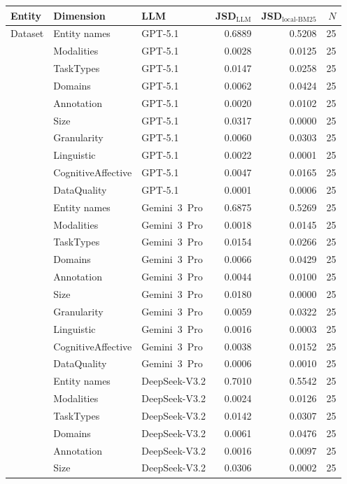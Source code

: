 \begin{tabular}{lllrrr}
\toprule
Entity & Dimension & LLM & JSD$_{\mathrm{LLM}}$ & JSD$_{\mathrm{local\text{-}BM25}}$ & $N$ \\
\midrule
Dataset & Entity names & GPT-5.1 & 0.6889 & 0.5208 & 25 \\
 & Modalities & GPT-5.1 & 0.0028 & 0.0125 & 25 \\
 & TaskTypes & GPT-5.1 & 0.0147 & 0.0258 & 25 \\
 & Domains & GPT-5.1 & 0.0062 & 0.0424 & 25 \\
 & Annotation & GPT-5.1 & 0.0020 & 0.0102 & 25 \\
 & Size & GPT-5.1 & 0.0317 & 0.0000 & 25 \\
 & Granularity & GPT-5.1 & 0.0060 & 0.0303 & 25 \\
 & Linguistic & GPT-5.1 & 0.0022 & 0.0001 & 25 \\
 & CognitiveAffective & GPT-5.1 & 0.0047 & 0.0165 & 25 \\
 & DataQuality & GPT-5.1 & 0.0001 & 0.0006 & 25 \\
 & Entity names & Gemini~3~Pro & 0.6875 & 0.5269 & 25 \\
 & Modalities & Gemini~3~Pro & 0.0018 & 0.0145 & 25 \\
 & TaskTypes & Gemini~3~Pro & 0.0154 & 0.0266 & 25 \\
 & Domains & Gemini~3~Pro & 0.0066 & 0.0429 & 25 \\
 & Annotation & Gemini~3~Pro & 0.0044 & 0.0100 & 25 \\
 & Size & Gemini~3~Pro & 0.0180 & 0.0000 & 25 \\
 & Granularity & Gemini~3~Pro & 0.0059 & 0.0322 & 25 \\
 & Linguistic & Gemini~3~Pro & 0.0016 & 0.0003 & 25 \\
 & CognitiveAffective & Gemini~3~Pro & 0.0038 & 0.0152 & 25 \\
 & DataQuality & Gemini~3~Pro & 0.0006 & 0.0010 & 25 \\
 & Entity names & DeepSeek-V3.2 & 0.7010 & 0.5542 & 25 \\
 & Modalities & DeepSeek-V3.2 & 0.0024 & 0.0126 & 25 \\
 & TaskTypes & DeepSeek-V3.2 & 0.0142 & 0.0307 & 25 \\
 & Domains & DeepSeek-V3.2 & 0.0061 & 0.0476 & 25 \\
 & Annotation & DeepSeek-V3.2 & 0.0016 & 0.0097 & 25 \\
 & Size & DeepSeek-V3.2 & 0.0306 & 0.0002 & 25 \\

\end{tabular}

